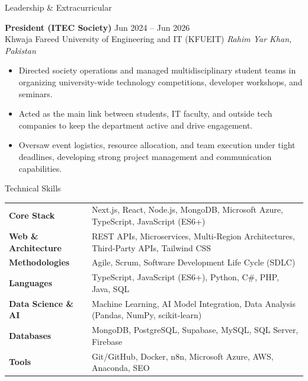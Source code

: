 \documentclass{resume} %
\begin{document}
\begin{rSection}{Leadership \& Extracurricular}

\textbf{President (ITEC Society)} \hfill Jun 2024 -- Jun 2026\\
Khwaja Fareed University of Engineering and IT (KFUEIT) \hfill \textit{Rahim Yar Khan, Pakistan}
 \begin{itemize}
    \itemsep -3pt {} 
     \item Directed society operations and managed multidisciplinary student teams in organizing university-wide technology competitions, developer workshops, and seminars.
     \item Acted as the main link between students, IT faculty, and outside tech companies to keep the department active and drive engagement.
     \item Oversaw event logistics, resource allocation, and team execution under tight deadlines, developing strong project management and communication capabilities.
 \end{itemize}

\end{rSection}


\begin{rSection}{Technical Skills}

\begin{tabular}{ @{} >{\bfseries}l @{\hspace{2ex}} l }
Core Stack & Next.js, React, Node.js, MongoDB, Microsoft Azure, TypeScript, JavaScript (ES6+) \\
Web \& Architecture & REST APIs, Microservices, Multi-Region Architectures, Third-Party APIs, Tailwind CSS \\
Methodologies & Agile, Scrum, Software Development Life Cycle (SDLC) \\
Languages & TypeScript, JavaScript (ES6+), Python, C\#, PHP, Java, SQL \\
Data Science \& AI & Machine Learning, AI Model Integration, Data Analysis (Pandas, NumPy, scikit-learn) \\
Databases & MongoDB, PostgreSQL, Supabase, MySQL, SQL Server, Firebase \\
Tools & Git/GitHub, Docker, n8n, Microsoft Azure, AWS, Anaconda, SEO
\end{tabular}\\
\end{rSection}
\end{document}

